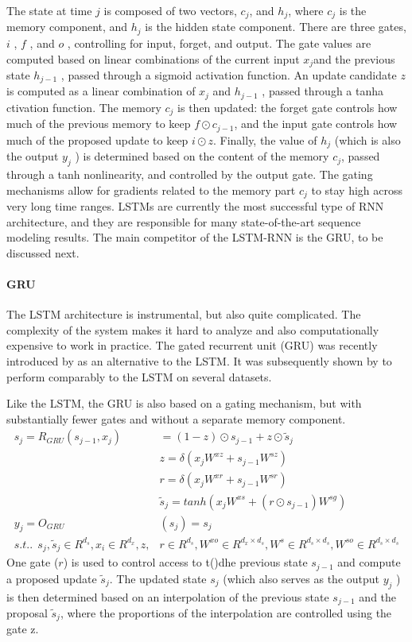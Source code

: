 \documentclass{article}
\begin{document}
The state at time $j$ is composed of two vectors, $c_j$, and $h_j$, where $c_j$ is the memory component, and $h_j$ is the hidden state component. There are three gates, $i$ , $ f $ , and $o$ , controlling for input, forget, and output. The gate values are computed based on linear combinations of the current input $x_j $and the previous state $h_{j-1}$ , passed through a sigmoid activation function. An update candidate $z$ is computed as a linear combination of $x_j $ and $h_{j-1}$ , passed through a tanha ctivation function. The memory $c_j$ is then updated: the forget gate controls how much of the previous memory to keep $f\odot c_{j-1}$, and the input gate controls how much of the proposed update to keep $i \odot z$. Finally, the value of $ h_j$ (which is also the output $y_j$ ) is determined based on the content of the memory $c_j$, passed through a tanh nonlinearity, and controlled by the output gate. The gating mechanisms allow for gradients related to the memory part $c_j$ to stay high across very long time ranges.
LSTMs are currently the most successful type of RNN architecture, and they are responsible for many state-of-the-art sequence modeling results. The main competitor of the LSTM-RNN is the GRU, to be discussed next.
\paragraph{GRU}
The LSTM architecture is instrumental, but also quite complicated. The complexity of the system makes it hard to analyze and also computationally expensive to work in practice. The gated recurrent unit (GRU) was recently introduced by \citep{DBLP:journals/corr/ChoMGBSB14} as an alternative to the LSTM. It was subsequently shown by \citep{DBLP:journals/corr/ChungGCB14} to perform comparably to the LSTM on several datasets.

Like the LSTM, the GRU is also based on a gating mechanism, but with substantially fewer gates and without a separate memory component.
\begin{align}
	s_j=R_{GRU}(s_{j-1},x_j)&=(1-z) \odot s_{j-1} +z \odot \widetilde s_j \\&z=\delta (x_j W^{xz}+s_{j-1}W^{sz}) \\ &r=\delta (x_j W^{xr}+s_{j-1}W^{sr}) \\ &\widetilde s_j=tanh(x_j W^{xs}+(r \odot  s_{j-1})W^{sg}) \\ y_j=O_{GRU}&(s_j)=s_j \\s.t.. \ \ s_j, \widetilde s_j \in R^{{d_{s}}},x_i \in R^{d_{x}},z,&r \in R^{d_s},W^{xo} \in R^{d_x \times d_{s}},W^s \in R^{d_s \times d_{s}},W^{so} \in R^{d_s \times d_{s}}
\end{align}
One gate ($r$) is used to control access to t()dhe previous state $s_{j-1}$ and compute a proposed update $\widetilde s_j$. The updated state $s_j$  (which also serves as the output $y_j$ ) is then determined based on an interpolation of the previous state $s_{j-1}$ and the proposal $\widetilde s_j$, where the proportions of the interpolation are controlled using the gate z. 
\end{document}
